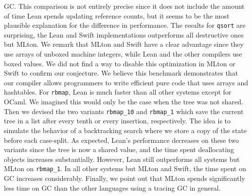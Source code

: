 GC.  This comparison is not entirely precise since it does not include
the amount of time Lean spends updating reference counts, but it seems
to be the most plausible explanation for the difference in
performance.  The results for \verb!qsort! are surprising, the
Lean and Swift implementations outperforms all destructive ones but
MLton. We remark that MLton and Swift have a clear advantage since they use
arrays of unboxed machine integers, while Lean and the other compilers
use boxed values. We did not find a way to disable this optimization
in MLton or Swift to confirm our conjecture.  We believe this benchmark
demonstrates that our compiler allows programmers to write efficient
pure code that uses arrays and hashtables. For \verb!rbmap!, Lean is
much faster than all other systems except for OCaml. We imagined this would only be the case
when the tree was not shared. Then we devised the two variants
\verb!rbmap_10! and \verb!rbmap_1! which save the
current tree in a list after every tenth or every insertion, respectively.
The idea is to simulate the behavior of a backtracking search where we
store a copy of the state before each case-split. As expected, Lean's
performance decreases on these two variants since the tree is now a
shared value, and the time spent deallocating objects increases
substantially.  However, Lean still outperforms all systems but MLton
on \verb!rbmap_1!.  In all other systems but MLton and Swift, the time
spent on GC increases considerably. Finally, we point out that
MLton spends significantly less time on GC than the other languages using
a tracing GC in general.


